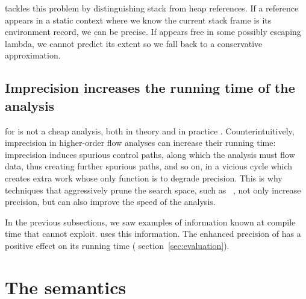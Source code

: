 \documentclass{LMCS}
\theoremstyle{definition} \newtheorem{property}[thm]{Property}
\begin{document}
\cfat{} tackles this problem by distinguishing stack from heap references.
If a reference  appears in a static context where we know the current stack 
frame is its environment record, we can be precise.
If  appears free in some possibly escaping lambda, we cannot predict its
extent so we fall back to a conservative approximation.

\subsection{Imprecision increases the running time of the analysis}

\kcfa{} for  is not a cheap analysis, both in theory
\cite{conf/icfp/08/vanhorn/kcfa} and in practice
\cite{conf/pldi/88/shivers/cfaretro}.
Counterintuitively, imprecision in higher-order flow analyses can increase 
their running time: imprecision induces spurious control paths, along which the
analysis must flow data, thus creating further spurious paths, and so on, in a 
vicious cycle which creates extra work whose only function is to degrade 
pre\-ci\-sion.
This is why techniques that aggressively prune the search space, such as 
\cfa{\Gamma}~\cite{conf/icfp/06/might/gcfa}, not only increase precision, but 
can also improve the speed of the analysis.

In the previous subsections, we saw examples of information known at compile 
time that \kcfa{} cannot exploit.
\cfat{} uses this information. 
The enhanced precision of \cfat{} has a positive effect on its running
time (\confer{} section~\ref{sec:evaluation}).


\section{The {\cfat} semantics\label{sec:cfa2sems}}
\end{document}

